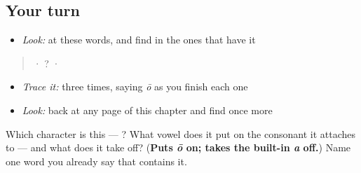 \subsection*{Your turn}
\begin{itemize}
\raggedright
  \item \emph{Look:} at these words, and find  in the ones that have it
\end{itemize}

\begin{quote}
  ·  ?  ·  
\end{quote}

\begin{itemize}
\raggedright
  \item \emph{Trace it:}  three times, saying \emph{ō} as you finish each one
  \item \emph{Look:} back at any page of this chapter and find  once more
\end{itemize}

\begin{tcolorbox}[breakable,colback=teal!4,colframe=teal!35!black,title={Before you move on}]
Which character is this — ? What vowel does it put on the consonant it attaches to — and what does it take off? (\textbf{Puts \emph{ō} on; takes the built-in \emph{a} off.}) Name one word you already say that contains it.
\end{tcolorbox}
